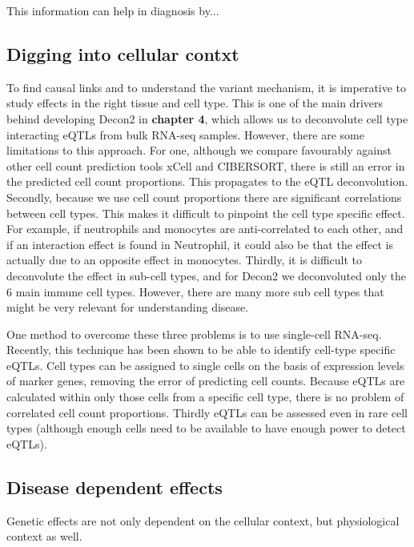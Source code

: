 This information can help in diagnosis by...


\subsection{Digging into cellular contxt}
To find causal links and to understand the variant mechanism, it is imperative to study effects in the right tissue and cell type. This is one of the main drivers behind developing Decon2 in \textbf{chapter 4}, which allows us to deconvolute cell type interacting eQTLs from bulk RNA-seq samples. However, there are some limitations to this approach. For one, although we compare favourably against other cell count prediction tools xCell\cite{aranXCellDigitallyPortraying2017} and CIBERSORT\cite{newmanRobustEnumerationCell2015}, there is still an error in the predicted cell count proportions. This propagates to the eQTL deconvolution. Secondly, because we use cell count proportions there are significant correlations between cell types. This makes it difficult to pinpoint the cell type specific effect. For example, if neutrophils and monocytes are anti-correlated to each other, and if an interaction effect is found in Neutrophil, it could also be that the effect is actually due to an opposite effect in monocytes. Thirdly, it is difficult to deconvolute the effect in sub-cell types, and for Decon2 we deconvoluted only the 6 main immune cell types. However, there are many more sub cell types that might be very relevant for understanding disease.

One method to overcome these three problems is to use single-cell RNA-seq\cite{tangMRNASeqWholetranscriptomeAnalysis2009}. Recently, this technique has been shown to be able to identify cell-type specific eQTLs\cite{vanderwijstSinglecellRNASequencing2018b}. Cell types can be assigned to single cells on the basis of expression levels of marker genes, removing the error of predicting cell counts. Because eQTLs are calculated within only those cells from a specific cell type, there is no problem of correlated cell count proportions. Thirdly eQTLs can be assessed even in rare cell types (although enough cells need to be available to have enough power to detect eQTLs).

\subsection{Disease dependent effects}
Genetic effects are not only dependent on the cellular context, but physiological context as well. 

